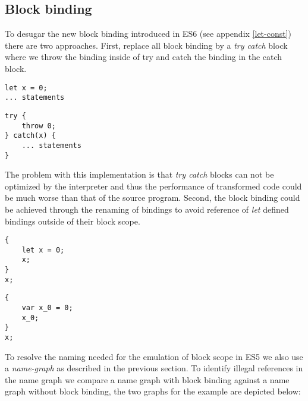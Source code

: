 \subsection{Block binding}
To desugar the new block binding introduced in ES6 (see appendix \ref{let-const}) there are two approaches. First, replace all block binding by a \textit{try catch} block where we throw the binding inside of try and catch the binding in the catch block.

\begin{minipage}{0.45\linewidth}
\begin{lstlisting}
let x = 0;
... statements
\end{lstlisting}
\end{minipage}
\hfill
\begin{minipage}{0.45\linewidth}
\begin{lstlisting}
try {
	throw 0;
} catch(x) {
	... statements
}
\end{lstlisting}
\end{minipage}

The problem with this implementation is that \textit{try catch} blocks can not be optimized by the interpreter and thus the performance of transformed code could be much worse than that of the source program. Second, the block binding could be achieved through the renaming of bindings to avoid reference of \textit{let} defined bindings outside of their block scope.

\begin{minipage}{0.45\linewidth}
\begin{lstlisting}
{
	let x = 0;
	x;
}
x;
\end{lstlisting}
\end{minipage}
\hfill
\begin{minipage}{0.45\linewidth}
\begin{lstlisting}
{
	var x_0 = 0;
	x_0;
}
x;
\end{lstlisting}
\end{minipage}

To resolve the naming needed for the emulation of block scope in ES5 we also use a \textit{name-graph} as described in the previous section. To identify illegal references in the name graph we compare a name graph with block binding against a name graph without block binding, the two graphs for the example are depicted below:

